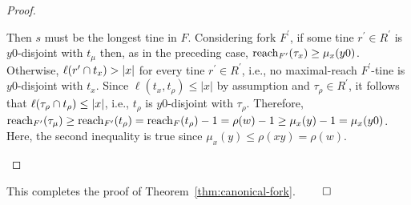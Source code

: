 \begin{proof}
\begin{description}[font=\normalfont\itshape\space]
\begin{description}[font=\normalfont\itshape\space]

						Then $s$ must be the longest tine in $F$.
						Considering fork $F^\prime$,
						if some tine $r^\prime \in R^\prime$ is $y0$-disjoint with $t_\mu$ 
						then, as in the preceding case, 
						$\operatorname{reach}_{F^\prime}(\tau_x) \geq \mu_x(y0)$. 
						Otherwise, $\ell(r^\prime \cap t_x) > |x|$ for every tine $r^\prime \in R^\prime$, 
						i.e., no maximal-reach $F^\prime$-tine is $y0$-disjoint with $t_x$. 
						Since $\ell(t_x, t_\rho) \leq |x|$ by assumption 
						and $\tau_\rho \in R^\prime$, it follows that 
						$\ell(\tau_\rho \cap t_\rho) \leq |x|$, i.e., 
						$t_\rho$ is $y0$-disjoint with $\tau_\rho$.
						Therefore, 
						$\operatorname{reach}_{F^\prime}(\tau_\mu) \geq \operatorname{reach}_{F^\prime}(t_\rho) = \operatorname{reach}_{F}(t_\rho) - 1 = \rho(w) - 1 \geq \mu_x(y) - 1 = \mu_x(y0)$. 
						Here, the second inequality is true since $\mu_x(y) \leq \rho(xy) = \rho(w)$.

				\end{description}


		\end{description}
		
	\end{proof}

	This completes the proof of Theorem~\ref{thm:canonical-fork}. 
	\hfill $\qed$




